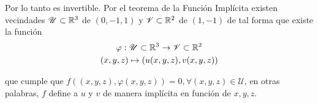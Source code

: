 \documentclass[a4paper,oneside,10.5pt]{article}
\begin{document}
Por lo tanto es invertible. Por el teorema de la Función Implícita existen vecindades $\mathcal{U} \subset \mathbb{R}^3$ de $(0, -1, 1)$ y $\mathcal{V} \subset \mathbb{R}^2$ de $(1, -1)$ de tal forma que existe la función
\begin{gather*}
    \varphi : \mathcal{U} \subset \mathbb{R}^3 \to \mathcal{V} \subset \mathbb{R}^2\\
    (x, y, z) \mapsto (u(x, y, z), v(x, y, z))
\end{gather*}

que cumple que $f((x, y, z), \varphi(x, y, z)) = 0, \forall (x, y, z) \in \mathcal{U}$, en otras palabras, $f$ define a $u$ y $v$ de manera implícita en función de $x, y, z$.
\end{document}
